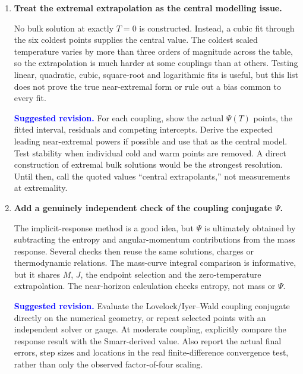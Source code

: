 \documentclass[11pt,a4paper]{article}
\newcommand{\issue}[1]{\textcolor{critical}{\textbf{#1}}}
\newcommand{\suggestion}[1]{\par\smallskip\noindent\textcolor{blue}{\textbf{Suggested revision.}} #1}
\begin{document}
\begin{enumerate}
\suggestion{Repeat the complete cold sequence and the $T=0$ extrapolation at several resolutions near both endpoints and around the valley, especially the samples near $y\simeq0.118$, $0.175$ and $0.229$.  Ideally do this at all 13 couplings.  Tabulate the convergence of $M$, $J$, $S$, $\Psi$, $y$ and the final intercept separately.  State the matrix norm and variable scaling used for the condition number.}

\item \issue{Treat the extremal extrapolation as the central modelling issue.}

No bulk solution at exactly $T=0$ is constructed.  Instead, a cubic fit through the six coldest points supplies the central value.  The coldest scaled temperature varies by more than three orders of magnitude across the table, so the extrapolation is much harder at some couplings than at others.  Testing linear, quadratic, cubic, square-root and logarithmic fits is useful, but this list does not prove the true near-extremal form or rule out a bias common to every fit.

\suggestion{For each coupling, show the actual $\Psi(T)$ points, the fitted interval, residuals and competing intercepts.  Derive the expected leading near-extremal powers if possible and use that as the central model.  Test stability when individual cold and warm points are removed.  A direct construction of extremal bulk solutions would be the strongest resolution.  Until then, call the quoted values ``central extrapolants,'' not measurements at extremality.}

\item \issue{Add a genuinely independent check of the coupling conjugate $\Psi$.}

The implicit-response method is a good idea, but $\Psi$ is ultimately obtained by subtracting the entropy and angular-momentum contributions from the mass response.  Several checks then reuse the same solutions, charges or thermodynamic relations.  The mass-curve integral comparison is informative, but it shares $M$, $J$, the endpoint selection and the zero-temperature extrapolation.  The near-horizon calculation checks entropy, not mass or $\Psi$.

\suggestion{Evaluate the Lovelock/Iyer--Wald coupling conjugate directly on the numerical geometry, or repeat selected points with an independent solver or gauge.  At moderate coupling, explicitly compare the response result with the Smarr-derived value.  Also report the actual final errors, step sizes and locations in the real finite-difference convergence test, rather than only the observed factor-of-four scaling.}


\end{enumerate}
\end{document}
